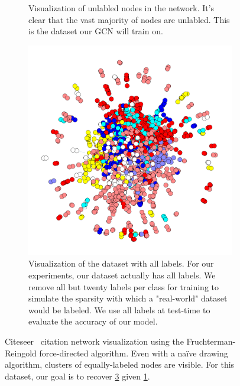 \begin{figure}
\begin{subfigure}{0.32\textwidth}
		\caption{Visualization of unlabled nodes in the network. It's clear that the vast majority of nodes are unlabled. This is the dataset our GCN will train on.} %
        \label{fig:dataset_train}
	\end{subfigure}
	\vspace{1em} %
    \begin{subfigure}{0.32\textwidth} %
		\includegraphics[width=\textwidth]{media/labels_all.png}
        \caption{Visualization of the dataset with all labels. For our experiments, our dataset actually has all labels. We remove all but twenty labels per class for training to simulate the sparsity with which a "real-world" dataset would be labeled. We use all labels at test-time to evaluate the accuracy of our model.} %
        \label{fig:dataset_all}
	\end{subfigure}
	\caption{Citeseer~\cite{DBLP:journals/corr/YangCS16} citation network visualization using the Fruchterman-Reingold force-directed algorithm. Even with a na\"ive drawing algorithm, clusters of equally-labeled nodes are visible. For this dataset, our goal is to recover \ref{fig:dataset_all} given \ref{fig:dataset_train}.} %
\end{figure}


